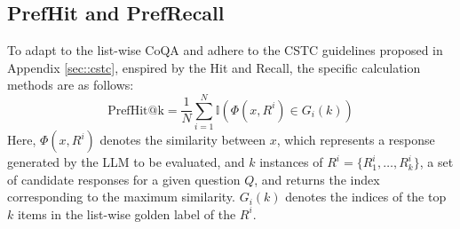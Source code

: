 
\subsection{PrefHit and PrefRecall}
To adapt to the list-wise CoQA and adhere to the CSTC guidelines proposed in Appendix \ref{sec::cstc}, enspired by the Hit and Recall, the specific calculation methods are as follows:
\begin{equation}
\text{PrefHit@k} = \frac{1}{N} \sum_{i=1}^{N} \mathbb{I}(\Phi (x,R^i)\in G_i(k))
\end{equation}
Here, \( \Phi(x, R^i) \) denotes the similarity between \( x \), which represents a response generated by the LLM to be evaluated, and \( k \) instances of \( R^i = \{R_1^i, \ldots, R_k^i\} \), a set of candidate responses for a given question \( Q \), and returns the index corresponding to the maximum similarity.
\( G_i(k) \) denotes the indices of the top \( k \) items in the list-wise golden label of the \(R^i\).

